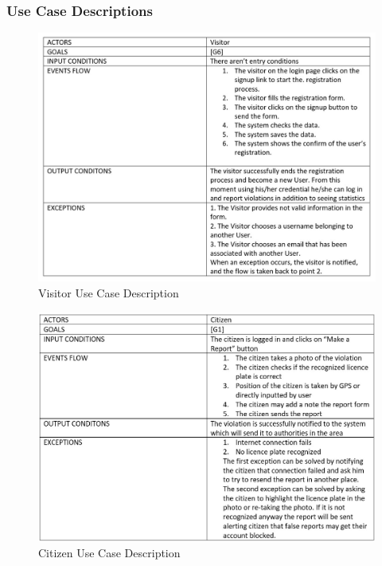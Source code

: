 \subsubsection{Use Case Descriptions}
\begin{figure}[h]
\centering
\includegraphics[width=\textwidth]{Images/visitor_use_case.png}
\caption{\label{fig:VUCD}Visitor Use Case Description}
\end{figure}
\begin{figure}[h]
\centering
\includegraphics[width=\textwidth]{Images/citizen_use_case.png}
\caption{\label{fig:CUCD}Citizen Use Case Description }
\end{figure}
